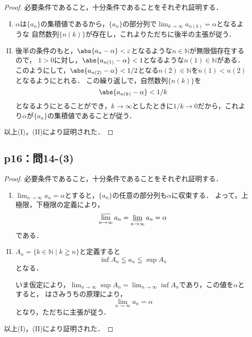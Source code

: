 \documentclass[uplatex,dvipdfmx,a4paper,10pt,fleqn]{jsarticle}
\begin{document}
\begin{tleftbar}
    \begin{proof}
    必要条件であること，十分条件であることをそれぞれ証明する．
    \begin{enumerate}[(I)]
        \item $\alpha$は$\{ a_n \}$の集積値であるから，$\{ a_n \}$の部分列で$\lim_{k\to \infty} a_{n(k)} = \alpha$となるような
        自然数列$\{ n (k) \}$が存在し，これよりただちに後半の主張が従う．
        \item 後半の条件のもと，$\abs{a_n - \alpha}< \varepsilon$となるような$n \in \mathbb{N}$が無限個存在するので，
        $1>0$に対し，$\abs{a_{n(1)}-\alpha}<1$となるような$n(1) \in \mathbb{N}$がある．
        このようにして，$\abs{a_{n(2)}-\alpha}< 1/2$となる$n(2) \in \mathbb{N}$を$n (1)<n(2)$となるようにとれる．
        この繰り返しで，自然数列$\{ n(k) \}$を
        \[
            \abs{a_{n(k)}-\alpha}< 1/k
        \]
        となるようにとることができ，$k \to \infty$としたときに$1/k \to 0$だから，これより$\alpha$が$\{ a_n \}$の集積値であることが従う．
    \end{enumerate}
    以上(I)，(II)により証明された．
    \end{proof}
\end{tleftbar}


\subsection*{p16：問14-(3)}

\begin{tleftbar}
    \begin{proof}
    必要条件であること，十分条件であることをそれぞれ証明する．
    \begin{enumerate}[(I)]
        \item $\lim_{n \to \infty} a_n = \alpha$とすると，$\{ a_n \}$の任意の部分列も$\alpha$に収束する．
        よって，上極限，下極限の定義により，
        \[
            \varlimsup_{n \to \infty} a_n = \varliminf_{n \to \infty} a_n = \alpha
        \]
        である．
        \item $ A_n =\{ k \in \mathbb{N} \mid k \geqq n \}$と定義すると
        \[
            \inf A_n \leqq a_n \leqq \sup A_n
        \]
        となる．

        いま仮定により，$\lim_{n \to \infty} \sup A_n = \lim_{n \to \infty} \inf A_n$であり，この値を$\alpha$とすると，
        はさみうちの原理により，
        \[
            \lim_{n \to \infty} a_n = \alpha
        \]
        となり，ただちに主張が従う．
    \end{enumerate}
    以上(I)，(II)により証明された．
\end{proof}
\end{tleftbar}
\end{document}
